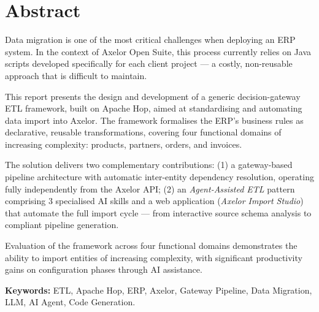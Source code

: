 \chapter*{Abstract}

Data migration is one of the most critical challenges when deploying an ERP system. In the context of Axelor Open Suite, this process currently relies on Java scripts developed specifically for each client project — a costly, non-reusable approach that is difficult to maintain.

This report presents the design and development of a generic decision-gateway ETL framework, built on Apache Hop, aimed at standardising and automating data import into Axelor. The framework formalises the ERP's business rules as declarative, reusable transformations, covering four functional domains of increasing complexity: products, partners, orders, and invoices.

The solution delivers two complementary contributions: (1) a gateway-based pipeline architecture with automatic inter-entity dependency resolution, operating fully independently from the Axelor API; (2) an \textit{Agent-Assisted ETL} pattern comprising 3 specialised AI skills and a web application (\textit{Axelor Import Studio}) that automate the full import cycle — from interactive source schema analysis to compliant pipeline generation.

Evaluation of the framework across four functional domains demonstrates the ability to import entities of increasing complexity, with significant productivity gains on configuration phases through AI assistance.

\textbf{Keywords:} ETL, Apache Hop, ERP, Axelor, Gateway Pipeline, Data Migration, LLM, AI Agent, Code Generation.
